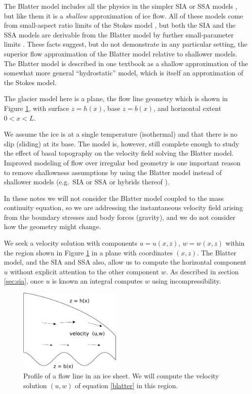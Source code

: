 \documentclass[11pt,final,reqno]{amsart}
\theoremstyle{remark}
\theoremstyle{definition}
\begin{document}
The Blatter model includes all the physics in the simpler SIA or SSA models \cite{SchoofHindmarsh}, but like them it is a \emph{shallow} approximation of ice flow.  All of these models come from small-aspect ratio limits of the Stokes model \cite{Fowler,SchoofHindmarsh}, but both the SIA and the SSA models are derivable from the Blatter model by further small-parameter limits \cite{SchoofHindmarsh}.  These facts suggest, but do not demonstrate in any particular setting, the superior flow approximation of the Blatter model relative to shallower models.  The Blatter model is described in one textbook \cite[subsection 5.3]{GreveBlatter2009} as a shallow approximation of the somewhat more general ``hydrostatic'' model, which is itself an approximation of the Stokes model.

The glacier model here is a plane, the flow line geometry which is shown in Figure \ref{fig:profile}, with surface $z=h(x)$, base $z=b(x)$, and horizontal extent $0<x<L$.

We assume the ice is at a single temperature (isothermal) and that there is no slip (sliding) at its base.  The model is, however, still complete enough to study the effect of basal topography on the velocity field solving the Blatter model.  Improved modeling of flow over irregular bed geometry is one important reason to remove shallowness assumptions by using the Blatter model instead of shallower models (e.g.~SIA or SSA or hybrids thereof \cite{BBssasliding,Goldberg2011}).

In these notes we will not consider the Blatter model coupled to the mass continuity equation, so we are addressing the instantaneous velocity field arising from the boundary stresses and body forces (gravity), and we do not consider how the geometry might change.

We seek a velocity solution with components $u=u(x,z)$, $w=w(x,z)$ within the region shown in Figure \ref{fig:profile} in a plane with coordinates $(x,z)$.  The Blatter model, and the SIA and SSA also, allow us to compute the horizontal component $u$ without explicit attention to the other component $w$.  As described in section \ref{sec:sia}, once $u$ is known an integral computes $w$ using incompressibility.

\begin{figure}[ht] 
\includegraphics[width=0.45\textwidth]{figs/profile}
\caption{Profile of a flow line in an ice sheet.  We will compute the velocity solution $(u,w)$ of equation \eqref{blatter} in this region.}
\label{fig:profile}
\end{figure}
\end{document}

